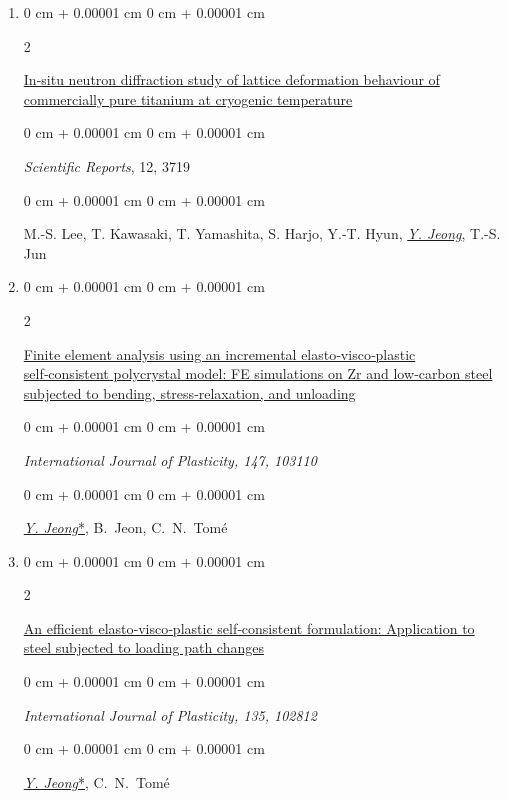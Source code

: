 \documentclass[10pt, letterpaper]{article}
\newenvironment{onecolentry}{
    \begin{adjustwidth}{
        0 cm + 0.00001 cm
    }{
        0 cm + 0.00001 cm
    }
}{
    \end{adjustwidth}
} %
\newenvironment{twocolentry}[2][]{
    \onecolentry
    \def\secondColumn{#2}
    \setcolumnwidth{\fill, 4.5 cm}
    \begin{paracol}{2}
}{
    \switchcolumn \raggedleft \secondColumn
    \end{paracol}
    \endonecolentry
} %
\begin{document}
\begin{enumerate}
        \item
        \begin{twocolentry}{2022}
            \href{https://doi.org/10.1038/s41598-022-07640-3}{In-situ neutron diffraction study of lattice deformation behaviour of commercially pure titanium at cryogenic temperature}
        \end{twocolentry}
        \begin{onecolentry}
            {\it Scientific Reports}, 12, 3719
        \end{onecolentry}
        \begin{onecolentry}
            M.-S. Lee, T. Kawasaki, T. Yamashita, S. Harjo, Y.-T. Hyun, {\underline{\textit{Y. Jeong}}}, T.-S. Jun
        \end{onecolentry}
        \vspace{0.10 cm}

        \item
        \begin{twocolentry}{2021}
            \href{https://doi.org/10.1016/j.ijplas.2021.103110}{Finite element analysis using an incremental elasto‑visco‑plastic self‑consistent polycrystal model: FE simulations on Zr and low‑carbon steel subjected to bending, stress‑relaxation, and unloading}
        \end{twocolentry}
        \begin{onecolentry}
            \it{International Journal of Plasticity}, 147, 103110
        \end{onecolentry}
        \begin{onecolentry}
            {\underline{\textit{Y. Jeong}*}}, \mbox{B. Jeon}, \mbox{C. N. Tomé}
        \end{onecolentry}
        \vspace{0.10 cm}

        \item
        \begin{twocolentry}{2020}
            \href{https://doi.org/10.1016/j.ijplas.2020.102812}{An efficient elasto‑visco‑plastic self‑consistent formulation: Application to steel subjected to loading path changes}
        \end{twocolentry}
        \begin{onecolentry}
            \it{International Journal of Plasticity}, 135, 102812
        \end{onecolentry}
        \begin{onecolentry}
            {\underline{\textit{Y. Jeong}*}}, \mbox{C. N. Tomé}
        \end{onecolentry}
        \vspace{0.10 cm}


\end{enumerate}
\end{document}
